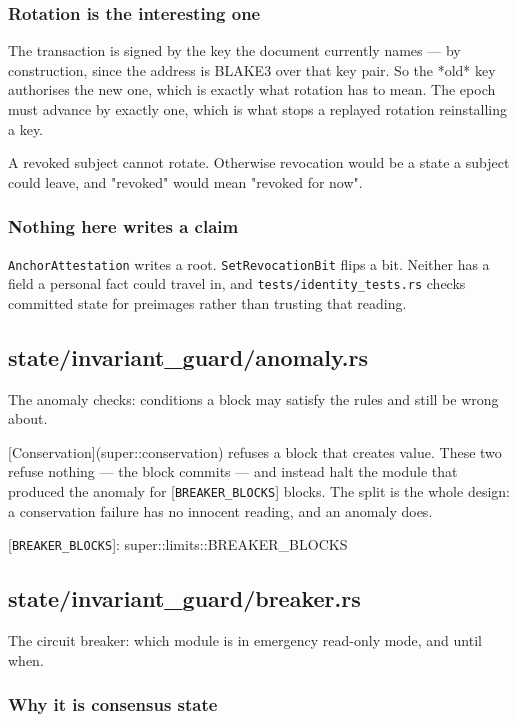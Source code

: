 \documentclass[11pt,a4paper]{article}
\begin{document}
\subsubsection{Rotation is the interesting one}

The transaction is signed by the key the document currently names — by
construction, since the address is BLAKE3 over that key pair. So the *old*
key authorises the new one, which is exactly what rotation has to mean. The
epoch must advance by exactly one, which is what stops a replayed rotation
reinstalling a key.

A revoked subject cannot rotate. Otherwise revocation would be a state a
subject could leave, and "revoked" would mean "revoked for now".

\subsubsection{Nothing here writes a claim}

\texttt{AnchorAttestation} writes a root. \texttt{SetRevocationBit} flips a bit. Neither
has a field a personal fact could travel in, and
\texttt{tests/identity\_tests.rs} checks committed state for preimages rather than
trusting that reading.

\subsection{state/invariant\_guard/anomaly.rs}
The anomaly checks: conditions a block may satisfy the rules and still be
wrong about.

[Conservation](super::conservation) refuses a block that creates value.
These two refuse nothing — the block commits — and instead halt the module
that produced the anomaly for [\texttt{BREAKER\_BLOCKS}] blocks. The split is the
whole design: a conservation failure has no innocent reading, and an
anomaly does.

[\texttt{BREAKER\_BLOCKS}]: super::limits::BREAKER\_BLOCKS

\subsection{state/invariant\_guard/breaker.rs}
The circuit breaker: which module is in emergency read-only mode, and
until when.

\subsubsection{Why it is consensus state}
\end{document}
